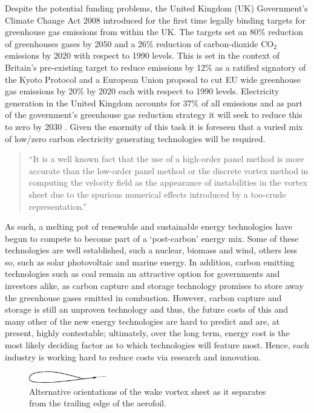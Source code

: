 Despite the potential funding problems, the United Kingdom (UK) Government's
Climate Change Act 2008 \citep*[see][2008]{CCA:2008:Defra} introduced for the
first time legally binding targets for greenhouse gas emissions from within the
UK. The targets set an 80\% reduction of greenhouses gases by 2050 and a 26\%
reduction of carbon-dioxide $\text{CO}_{2}$ emissions by 2020 with respect to
1990 levels. This is set in the context of Britain's pre-existing target to
reduce emissions by 12\% as a ratified signatory of the Kyoto Protocol
and a European Union proposal to cut EU wide greenhouse gas emissions by 20\% by
2020 each with respect to 1990 levels. Electricity generation in the United
Kingdom accounts for 37\% of all emissions and as part of the
government's greenhouse gas reduction strategy it will seek to reduce this to
zero by 2030 \citep[see][2008]{CCC:2008}. Given the enormity of this task it is
foreseen that a varied mix of low/zero carbon electricity generating
technologies will be required.
\begin{quote}
 ``It is a well known fact that the use of a high-order panel method is more
accurate than the
low-order panel method or the discrete vortex method in computing the velocity
field as the
appearance of instabilities in the vortex sheet due to the spurious numerical
effects introduced by
a too-crude representation.''
\end{quote}
As such, a melting pot of renewable and sustainable energy technologies have
begun to compete to become part of a `post-carbon' energy mix. Some of these
technologies are well established, such a nuclear, biomass and wind, others less
so, such as solar photovoltaic and marine energy. In addition, carbon emitting
technologies such as coal remain an attractive option for governments and
investors alike, as carbon capture and storage technology promises to store away
the greenhouse gases emitted in combustion. However, carbon capture and storage
is still an unproven technology and thus, the future costs of this and many
other of the new energy technologies are hard to predict and are, at present,
highly contestable; ultimately, over the long term, energy cost is the most
likely deciding factor as to which technologies will feature most. Hence, each
industry is working hard to reduce costs via research and innovation.

\begin{figure}[htb]
  \centering
  \includegraphics[width=0.3\textwidth]{bottomkutta}
  \caption{Alternative orientations of the wake vortex sheet as it separates
  from the trailing edge of the aerofoil.}
  \label{fig:bottomkutta}
\end{figure}